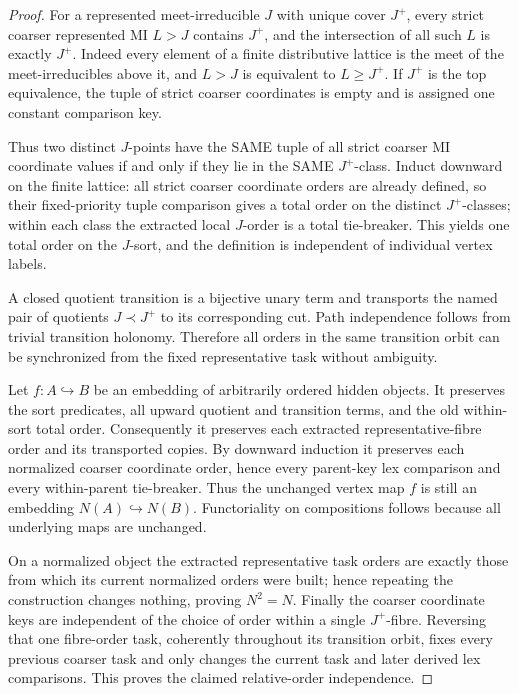 \begin{proof}
For a represented meet-irreducible \(J\)
with unique cover \(J^+\), every strict
coarser represented MI \(L>J\) contains
\(J^+\), and the intersection of all such
\(L\) is exactly \(J^+\). Indeed every
element of a finite distributive lattice
is the meet of the meet-irreducibles
above it, and \(L>J\) is equivalent to
\(L\ge J^+\). If \(J^+\) is the top
equivalence, the tuple of strict coarser
coordinates is empty and is assigned one
constant comparison key.

Thus two distinct \(J\)-points have the
SAME tuple of all strict coarser MI
coordinate values if and only if they
lie in the SAME \(J^+\)-class.
Induct downward on the finite lattice:
all strict coarser coordinate orders
are already defined, so their fixed-priority
tuple comparison gives a total order on
the distinct \(J^+\)-classes; within each
class the extracted local \(J\)-order
is a total tie-breaker. This yields one
total order on the \(J\)-sort, and the
definition is independent of individual
vertex labels.

A closed quotient transition is a
bijective unary term and transports
the named pair of quotients
\(J\prec J^+\) to its corresponding
cut. Path independence follows from
trivial transition holonomy. Therefore
all orders in the same transition orbit
can be synchronized from the fixed
representative task without ambiguity.

Let \(f:A\hookrightarrow B\) be an
embedding of arbitrarily ordered hidden
objects. It preserves the sort predicates,
all upward quotient and transition terms,
and the old within-sort total order.
Consequently it preserves each extracted
representative-fibre order and its transported
copies. By downward induction it preserves
each normalized coarser coordinate order,
hence every parent-key lex comparison and
every within-parent tie-breaker. Thus
the unchanged vertex map \(f\) is still
an embedding \(N(A)\hookrightarrow N(B)\).
Functoriality on compositions follows
because all underlying maps are unchanged.

On a normalized object the extracted
representative task orders are exactly
those from which its current normalized
orders were built; hence repeating the
construction changes nothing, proving
\(N^2=N\). Finally the coarser
coordinate keys are independent of
the choice of order within a single
\(J^+\)-fibre. Reversing that one
fibre-order task, coherently throughout
its transition orbit, fixes every
previous coarser task and only changes
the current task and later derived
lex comparisons. This proves the
claimed relative-order independence.
\end{proof}

